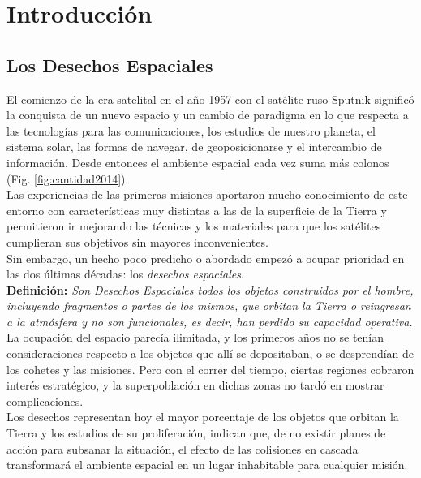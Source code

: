 \chapter{Introducción}
\label{chap:introduccion}


\section{Los Desechos Espaciales}

El comienzo de la era satelital en el a\~no 1957 con el sat\'elite ruso Sputnik signific\'o la conquista de un nuevo espacio y un cambio de paradigma en lo que respecta a las tecnolog\'ias para las comunicaciones, los estudios de nuestro planeta, el sistema solar, las formas de navegar, de geoposicionarse y el intercambio de informaci\'on. Desde entonces el ambiente espacial cada vez suma m\'as colonos (Fig. \ref{fig:cantidad2014}).\\

Las experiencias de las primeras misiones aportaron mucho conocimiento de este entorno con caracter\'isticas muy distintas a las de la superficie de la Tierra y permitieron ir mejorando las t\'ecnicas y los materiales para que los sat\'elites cumplieran sus objetivos sin mayores inconvenientes.\\
Sin embargo, un hecho poco predicho o abordado empez\'o a ocupar prioridad en las dos \'ultimas d\'ecadas: los {\it{desechos espaciales}}.\\

{\bf{Definici\'on:}}{\it{ Son Desechos Espaciales todos los objetos construidos por el hombre, incluyendo fragmentos o partes de los mismos, que orbitan la Tierra o reingresan a la atm\'osfera y no son funcionales, es decir, han perdido su capacidad operativa.}} \citep{iadcguide}\\

La ocupaci\'on del espacio parec\'ia ilimitada, y los primeros a\~nos no se ten\'ian consideraciones respecto a los objetos que all\'i se depositaban, o se desprend\'ian de los cohetes y las misiones. Pero con el correr del tiempo, ciertas regiones cobraron inter\' es estrat\'egico, y la superpoblaci\'on en dichas zonas no tard\'o en mostrar complicaciones.\\
Los desechos representan hoy el mayor porcentaje de los objetos que orbitan la Tierra y los estudios de su proliferaci\'on, indican que, de no existir planes de acci\'on para subsanar la situaci\'on, el efecto de las colisiones en cascada transformar\'a el ambiente espacial en un lugar inhabitable para cualquier misi\'on.\\

